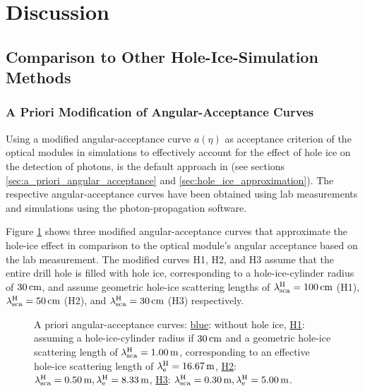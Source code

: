 \section{Discussion}
\label{sec:discussion}

\subsection{Comparison to Other Hole-Ice-Simulation Methods}
\label{sec:comparison_methods}

\subsubsection{A Priori Modification of Angular-Acceptance Curves}
\label{sec:a_priori_modification_of_angular_acception_curves}

\label{sec:a_priori_curve}

Using a modified angular-acceptance curve \(a(\eta)\) as acceptance
criterion of the optical modules in simulations to effectively account
for the effect of hole ice on the detection of photons, is the default
approach in \clsim (see sections \ref{sec:a_priori_angular_acceptance}
and \ref{sec:hole_ice_approximation}). The respective angular-acceptance
curves have been obtained using lab measurements and simulations using
the \photonics photon-propagation software.
\cite{icepaper, lundberg, photonics}


Figure \ref{fig:Wee4ahYa} shows three modified angular-acceptance curves
that approximate the hole-ice effect in comparison to the optical
module's angular acceptance based on the lab measurement. The modified
curves H1, H2, and H3 assume that the entire drill hole is filled with
hole ice, corresponding to a hole-ice-cylinder radius of \(30\text{\,cm}\), and
assume geometric hole-ice scattering lengths of
\(\lambda_\text{sca}^\text{H} = 100\text{\,cm}\) (H1), \(\lambda_\text{sca}^\text{H} = 50\text{\,cm}\) (H2), and
\(\lambda_\text{sca}^\text{H} = 30\text{\,cm}\) (H3) respectively.

\begin{figure}[htbp]
  \caption{A priori angular-acceptance curves: \underline{blue}: without hole ice, \underline{H1}: assuming a hole-ice-cylinder radius if $30\text{\,cm}$ and a geometric hole-ice scattering length of $\lambda_\text{sca}^\text{H} = 1.00\text{\,m}$, corresponding to an effective hole-ice scattering length of $\lambda_\text{e}^\text{H} = 16.67\text{\,m}$, \underline{H2}: $\lambda_\text{sca}^\text{H} = 0.50\text{\,m}, \lambda_\text{e}^\text{H} = 8.33\text{\,m}$, \underline{H3}: $\lambda_\text{sca}^\text{H} = 0.30\text{\,m}, \lambda_\text{e}^\text{H} = 5.00\text{\,m}$. \cite{icepaper, yag, icemodelsdata}}
  \label{fig:Wee4ahYa}
\end{figure}

